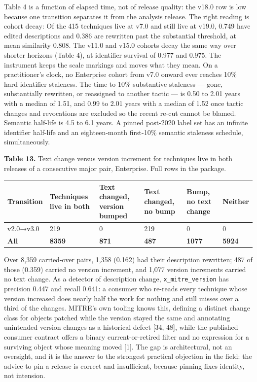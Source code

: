 \documentclass[11pt,a4paper]{article}
\begin{document}
Table 4 is a function of elapsed time, not of release quality: the v18.0 row is low because one transition separates it from the analysis release. The right reading is cohort decay: Of the 415 techniques live at v7.0 and still live at v19.0, 0.749 have edited descriptions and 0.386 are rewritten past the substantial threshold, at mean similarity 0.808. The v11.0 and v15.0 cohorts decay the same way over shorter horizons (Table 4), at identifier survival of 0.977 and 0.975. The instrument keeps the scale markings and moves what they mean. On a practitioner's clock, no Enterprise cohort from v7.0 onward ever reaches 10\% hard identifier staleness. The time to 10\% substantive staleness — gone, substantially rewritten, or reassigned to another tactic — is 0.50 to 2.01 years with a median of 1.51, and 0.99 to 2.01 years with a median of 1.52 once tactic changes and revocations are excluded so the recent re-cut cannot be blamed. Semantic half-life is 4.5 to 6.1 years. A pinned post-2020 label set has an infinite identifier half-life and an eighteen-month first-10\% semantic staleness schedule, simultaneously.

\textbf{Table 13.} Text change versus version increment for techniques live in both releases of a consecutive major pair, Enterprise. Full rows in the package.

\begin{center}\footnotesize
\begin{tabular}{llllll}
\toprule
Transition & Techniques live in both & Text changed, version bumped & Text changed, no bump & Bump, no text change & Neither \\
\midrule
v2.0→v3.0 & 219 & 0 & 219 & 0 & 0 \\
\textbf{All} & \textbf{8359} & \textbf{871} & \textbf{487} & \textbf{1077} & \textbf{5924} \\
\bottomrule
\end{tabular}
\end{center}

Over 8,359 carried-over pairs, 1,358 (0.162) had their description rewritten; 487 of those (0.359) carried no version increment, and 1,077 version increments carried no text change. As a detector of description change, \texttt{x\_mitre\_version} has precision 0.447 and recall 0.641: a consumer who re-reads every technique whose version increased does nearly half the work for nothing and still misses over a third of the changes. MITRE's own tooling knows this, defining a distinct change class for objects patched while the version stayed the same and annotating unintended version changes as a historical defect [34, 48], while the published consumer contract offers a binary current-or-retired filter and no expression for a surviving object whose meaning moved [1]. The gap is architectural, not an oversight, and it is the answer to the strongest practical objection in the field: the advice to pin a release is correct and insufficient, because pinning fixes identity, not intension.
\end{document}
